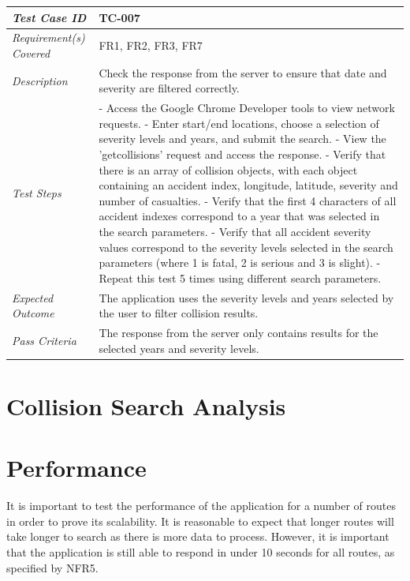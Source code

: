 \documentclass[authoryearcitations]{UoYCSproject}
\begin{document}
\begin{tabular}{| p{2.5cm} | p{11cm} |}
	\hline
	\textit{Test Case ID} & TC-007 \\ \hline
	\textit{Requirement(s) Covered} & FR1, FR2, FR3, FR7 \\ \hline
	\textit{Description} & Check the response from the server to ensure that date and severity are filtered correctly. \\ \hline
	\textit{Test Steps}& - Access the Google Chrome Developer tools to view network requests. 
	\newline - Enter start/end locations, choose a selection of severity levels and years, and submit the search.
	\newline - View the 'getcollisions' request and access the response.
	\newline - Verify that there is an array of collision objects, with each object containing an accident index, longitude, latitude, severity and number of casualties.
	\newline - Verify that the first 4 characters of all accident indexes correspond to a year that was selected in the search parameters.
	\newline - Verify that all accident severity values correspond to the severity levels selected in the search parameters (where 1 is fatal, 2 is serious and 3 is slight).
	\newline - Repeat this test 5 times using different search parameters.
 \\ \hline
	\textit{Expected Outcome} & The application uses the severity levels and years selected by the user to filter collision results.  \\ \hline
	\textit{Pass Criteria} & The response from the server only contains results for the selected years and severity levels. \\ \hline
\end{tabular}

\section{Collision Search Analysis}
\label{sec:searchAnalysis}

\section{Performance}

It is important to test the performance of the application for a number of routes in order to prove its scalability. It is reasonable to expect that longer routes will take longer to search as there is more data to process. However, it is important that the application is still able to respond in under 10 seconds for all routes, as specified by NFR5. 
\end{document}
